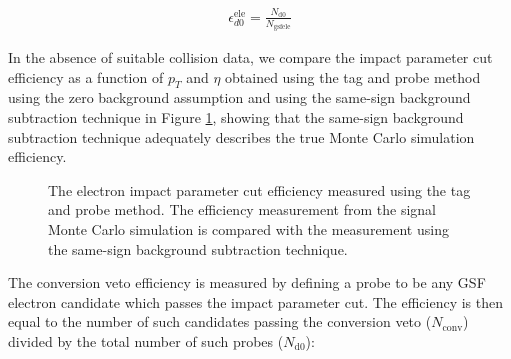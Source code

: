 \documentclass{cmspaper}
\begin{document}
\begin{eqnarray}
  \label{eqn:electrond0cutEfficiency}  
  \epsilon_{d0}^{\mathrm{ele}} = \frac{N_{\mathrm{d0}}}{N_{\mathrm{gsfele}}}
\end{eqnarray}

In the absence of suitable collision data, we compare the impact parameter cut efficiency as a function of $p_{T}$ and $\eta$ obtained using the tag and probe method using the zero background assumption and using the same-sign background subtraction technique in Figure \ref{d0CutEfficiency_TagAndProbe}, showing that the same-sign background subtraction technique adequately describes the true Monte Carlo simulation efficiency.

\begin{figure}[htb]
  \begin{center}
    \caption{The electron impact parameter cut efficiency measured using the tag and probe method. The efficiency measurement from the signal Monte Carlo simulation is compared with the measurement using the same-sign background subtraction technique.}
    \label{d0CutEfficiency_TagAndProbe}
  \end{center}
\end{figure}


The conversion veto efficiency is measured by defining a probe to be any GSF electron candidate which passes the impact parameter cut. The efficiency is then equal to the number of such candidates passing the conversion veto ($N_{\mathrm{conv}}$) divided by the total number of such probes ($N_{\mathrm{d0}}$):
\end{document}
